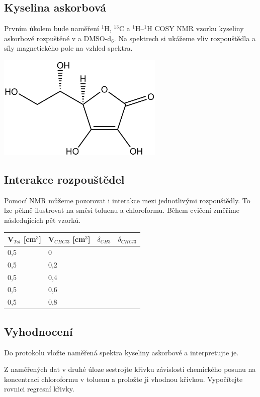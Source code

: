 \documentclass[12pt]{article}
\begin{document}
\subsection{Kyselina askorbová}

Prvním úkolem bude naměření $^1$H, $^{13}$C a $^1$H--$^1$H COSY NMR vzorku kyseliny askorbové rozpuštěné v  a DMSO-d$_6$. Na spektrech si ukážeme vliv rozpouštědla a síly magnetického pole na vzhled spektra.
\begin{center}
	\includegraphics[keepaspectratio,height=5cm]{img/kys-askorbova.png}
\end{center}
\newpage
\subsection{Interakce rozpouštědel}

Pomocí NMR můžeme pozorovat i interakce mezi jednotlivými rozpouštědly. To lze pěkně ilustrovat na směsi toluenu a chloroformu. Během cvičení změříme následujících pět vzorků.
\\

\begin{tabular}{|l|l|l|l|}
	\hline
	\textbf{V$_{Tol}$ [cm$^3$]} & \textbf{V$_{CHCl3}$ [cm$^3$]} & \textbf{$\delta_{CH3}$} 
	& \textbf{$\delta_{CHCl3}$} \\\hline
	0,5 & 0 & & \\\hline
	0,5 & 0,2 & & \\\hline
	0,5 & 0,4 & & \\\hline
	0,5 & 0,6 & & \\\hline
	0,5 & 0,8 & & \\\hline
\end{tabular}

\subsection{Vyhodnocení}

Do protokolu vložte naměřená spektra kyseliny askorbové a interpretujte je. 

Z naměřených dat v druhé úloze sestrojte křivku závislosti chemického posunu na koncentraci chloroformu v toluenu a proložte ji vhodnou křivkou. Vypočítejte rovnici regresní křivky.
\end{document}
